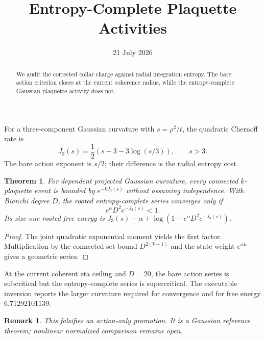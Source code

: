 \documentclass[11pt]{article}\usepackage[margin=1in]{geometry}\usepackage{amsmath,amsthm}\newtheorem{theorem}{Theorem}\newtheorem{remark}{Remark}
\title{Entropy-Complete Plaquette Activities}\author{}\date{21 July 2026}
\begin{document}
\maketitle
\begin{abstract}We audit the corrected collar charge against radial integration entropy. The bare action criterion closes at the current coherence radius, while the entropy-complete Gaussian plaquette activity does not.\end{abstract}
For a three-component Gaussian curvature with $s=\rho^2/t$, the quadratic Chernoff rate is
\[J_3(s)=\frac12\left(s-3-3\log(s/3)\right),\qquad s>3.\]
The bare action exponent is $s/2$; their difference is the radial entropy cost.
\begin{theorem}For dependent projected Gaussian curvature, every connected $k$-plaquette event is bounded by $e^{-kJ_3(s)}$ without assuming independence. With Bianchi degree $D$, the rooted entropy-complete series converges only if
\[e^\alpha D^2e^{-J_3(s)}<1.\]
Its size-one rooted free energy is $J_3(s)-\alpha+\log(1-e^\alpha D^2e^{-J_3(s)})$.\end{theorem}
\begin{proof}The joint quadratic exponential moment yields the first factor. Multiplication by the connected-set bound $D^{2(k-1)}$ and the state weight $e^{\alpha k}$ gives a geometric series.\end{proof}
At the current coherent eta ceiling and $D=20$, the bare action series is subcritical but the entropy-complete series is supercritical. The executable inversion reports the larger curvature required for convergence and for free energy $6.71292101139$.
\begin{remark}This falsifies an action-only promotion. It is a Gaussian reference theorem; nonlinear normalized comparison remains open.\end{remark}
\end{document}
